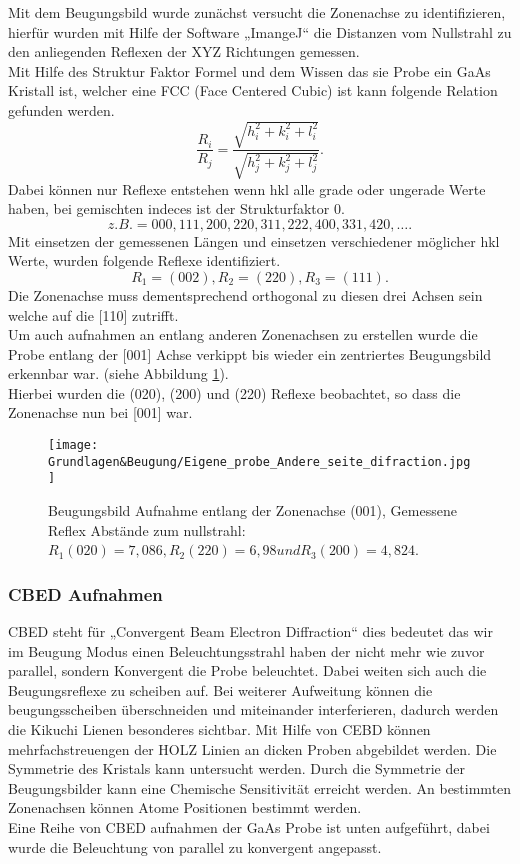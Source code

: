 Mit dem Beugungsbild wurde zunächst versucht die Zonenachse zu identifizieren, hierfür wurden mit Hilfe der Software „ImangeJ“ die Distanzen vom Nullstrahl zu den anliegenden Reflexen der XYZ Richtungen gemessen. \\
Mit Hilfe des Struktur Faktor Formel und dem Wissen das sie Probe ein GaAs Kristall ist, welcher eine FCC (Face Centered Cubic) ist kann folgende Relation gefunden werden.
\[
    \frac{R_i}{R_j} = \frac{\sqrt{h_i^2+k_i^2+l_i^2}}{\sqrt{h_j^2+k_j^2+l_j^2}}
.\]
Dabei können nur Reflexe entstehen wenn hkl alle grade oder ungerade Werte haben, bei gemischten indeces ist der Strukturfaktor 0.
\[
    z.B. = 000, 111, 200, 220, 311, 222, 400, 331, 420, …
.\]
Mit einsetzen der gemessenen Längen und einsetzen verschiedener möglicher hkl Werte, wurden folgende Reflexe identifiziert.
\[
R_1 = (002), R_2 = (220), R_3 = (111) 
.\]
Die Zonenachse muss dementsprechend orthogonal zu diesen drei Achsen sein welche auf die [110] zutrifft.\\
Um auch aufnahmen an entlang anderen Zonenachsen zu erstellen wurde die Probe entlang der [001] Achse verkippt bis wieder ein zentriertes Beugungsbild erkennbar war. (siehe Abbildung \cref{EP2BB}).\\
Hierbei wurden die (020), (200) und (220) Reflexe beobachtet, so dass die Zonenachse nun bei [001] war.

\begin{figure}[htbp]
 \centering
 \texttt{[image: Grundlagen\&Beugung/Eigene\_probe\_Andere\_seite\_difraction.jpg]}
 \caption[Beugungsbild(001)]{Beugungsbild Aufnahme entlang der Zonenachse (001), Gemessene Reflex Abstände zum nullstrahl: \( R_1(020)=7,086, R_2(220)= 6,98 und R_3(200)= 4,824 \).}
 \label{EP2BB}
\end{figure}

\subsubsection{CBED Aufnahmen}
CBED steht für „Convergent Beam Electron Diffraction“ dies bedeutet das wir im Beugung Modus einen Beleuchtungsstrahl haben der nicht mehr wie zuvor parallel, sondern Konvergent die Probe beleuchtet. Dabei weiten sich auch die Beugungsreflexe zu scheiben auf. Bei weiterer Aufweitung können die beugungsscheiben überschneiden und miteinander interferieren, dadurch werden die Kikuchi Lienen besonderes sichtbar.  Mit Hilfe von CEBD können mehrfachstreuengen der HOLZ Linien an dicken Proben abgebildet werden. Die Symmetrie des Kristals kann untersucht werden. Durch die Symmetrie der Beugungsbilder kann eine Chemische Sensitivität erreicht werden. An bestimmten Zonenachsen können Atome Positionen bestimmt werden.\\
Eine Reihe von CBED aufnahmen der GaAs Probe ist unten aufgeführt, dabei wurde die Beleuchtung von parallel zu konvergent angepasst.


